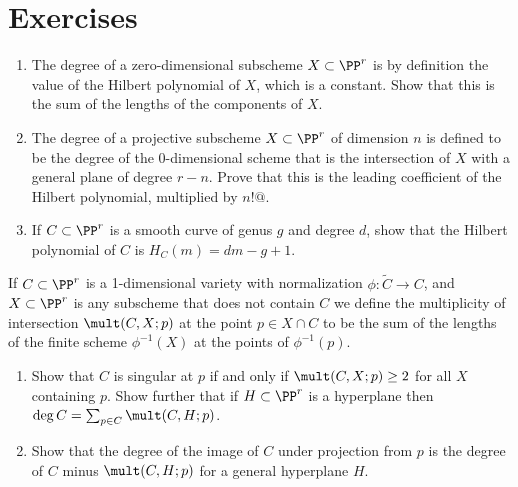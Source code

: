 \section{Exercises}


\begin{exercise}\label{characterization of degree}
%
%
\begin{enumerate}
\item The degree of a zero-dimensional subscheme $X\subset \PP^r$ is by definition the value of the Hilbert polynomial of $X$, which is a constant. Show that
this is the sum of the lengths of the components of $X$. 

\item The degree of a projective subscheme $X\subset \PP^r$ of dimension $n$ is defined to be the degree of the $0$-dimensional scheme
%
%
that is the intersection of $X$ with a general plane of degree $r-n$. Prove that this is the leading coefficient of the Hilbert polynomial, multiplied
%
by $n!@$. 

\item If $C\subset \PP^r$ is a smooth curve of genus $g$ and degree
  $d$, show that the 
 Hilbert polynomial of $C$ is $H_C(m) = dm-g+1$.
\end{enumerate}
\end{exercise}

\begin{exercise}
If $C\subset \PP^r$ is a 1-dimensional variety with normalization $\phi: \widetilde C\to C$, and $X\subset \PP^r$ is any subscheme that does
not contain $C$
we define the 
%
multiplicity
 of intersection $\mult(C,X;p)$ at the point $p \in X \cap C$ to be the sum of the lengths of the finite scheme $\phi^{-1}(X)$ at the points of $\phi^{-1}(p)$.
\begin{enumerate}
\item Show that $C$ is singular at $p$ if and only if $\mult(C,X;p) \geq 2$ for all $X$ containing $p$. Show further that if $H\subset \PP^r$ 
is a hyperplane then
 $\deg C = \sum_{p\in C} \mult(C,H;p)$. 
 \item Show that the degree of the image of $C$ under projection from $p$
 is 
the degree of $C$ minus
$\mult(C,H;p)$ for a general hyperplane $H$.
\end{enumerate}
\end{exercise}

